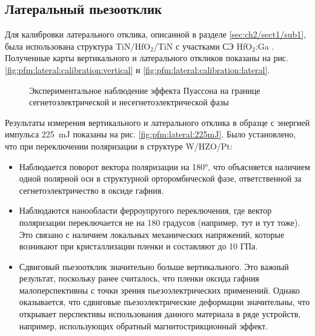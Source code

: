 \subsection{Латеральный пьезоотклик}

Для калибровки латерального отклика, описанной в разделе \cref{sec:ch2/sect1/sub1}, была использована структура TiN/HfO\(_2\)/TiN с участками СЭ HfO\(_2\):Ga \cite{chouprikNanoscaleTailoringFerroelectricity2020}. Полученные карты вертикального и латерального откликов показаны на рис. \cref{fig:pfm:lateral:calibration:vertical} и \cref{fig:pfm:lateral:calibration:lateral}.

\begin{figure}[ht]
    \caption[Этот текст попадает в названия рисунков в списке рисунков]{Экспериментальное наблюдение эффекта Пуассона на границе сегнетоэлектрической и несегнетоэлектрической фазы}\label{fig:pfm:lateral:calibration}
\end{figure}

Результаты измерения вертикального и латерального отклика в образце с энергией импульса \SI{225}{\milli\joule} показаны на рис. \cref{fig:pfm:lateral:225mJ}. Было установлено, что при переключении поляризации в структуре W/HZO/Pt:
\begin{itemize}
    \item Наблюдается поворот вектора поляризации на \ang{180}, что объясняется наличием одной полярной оси в структурной орторомбической фазе, ответственной за сегнетоэлектричество в оксиде гафния.
    \item Наблюдаются нанообласти ферроупругого переключения, где вектор поляризации переключается не на 180 градусов (например, тут и тут тоже). Это связано с наличием локальных механических напряжений, которые возникают при кристаллизации пленки и составляют до 10 ГПа.
    \item Сдвиговый пьезоотклик значительно больше вертикального. Это важный результат, поскольку ранее считалось, что пленки оксида гафния малоперспективны с точки зрения пьезоэлектрических применений. Однако оказывается, что сдвиговые пьезоэлектрические деформации значительны, что открывает перспективы использования данного материала в ряде устройств, например, использующих обратный магнитострикционный эффект.
\end{itemize}

